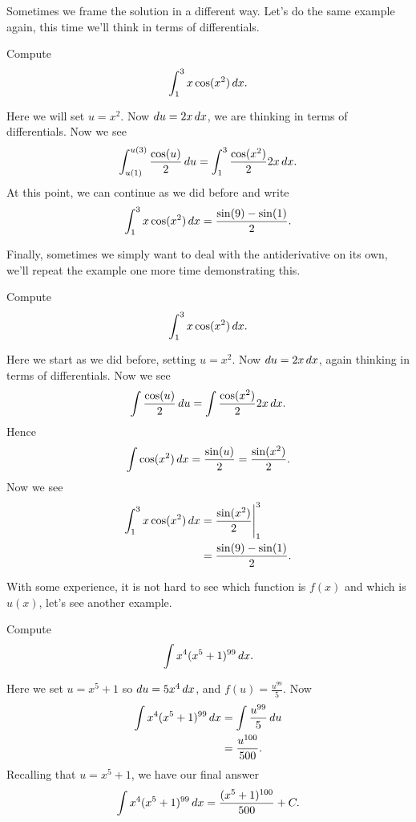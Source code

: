 Sometimes we frame the solution in a different way. Let's do the same
example again, this time we'll think in terms of differentials.

\begin{example}
Compute
\[
\int_1^3 x\cos(x^2)\, d x.
\]
\end{example}
\begin{solution}
Here we will set $u=x^2$. Now $du = 2x \, d x$, we are thinking in terms
of differentials. Now we see
\[
\int_{u(1)}^{u(3)} \frac{\cos(u)}{2}\, d u = \int_1^3\frac{\cos(x^2)}{2}2x\, d x.
\]
At this point, we can continue as we did before and write
\[
\int_1^3 x\cos(x^2)\, d x= \frac{\sin(9) -\sin(1)}{2}.
\]
\end{solution}

Finally, sometimes we simply want to deal with the antiderivative on
its own, we'll repeat the example one more time demonstrating this.

\begin{example}
Compute
\[
\int_1^3 x\cos(x^2)\, d x.
\]
\end{example}
\begin{solution}
Here we start as we did before, setting $u=x^2$. Now $du = 2x \, d x$,
again thinking in terms of differentials. Now we see
\[
\int  \frac{\cos(u)}{2}\, d u = \int \frac{\cos(x^2)}{2}2x\, d x.
\]
Hence 
\[
\int \cos(x^2)\, d x = \frac{\sin(u)}{2} = \frac{\sin(x^2)}{2}.
\]
Now we see
\begin{align*}
\int_1^3 x\cos(x^2)\, d x &=\frac{\sin(x^2)}{2}\Biggr|_1^3\\
&= \frac{\sin(9) -\sin(1)}{2}.
\end{align*}
\end{solution}

With some experience, it is not hard to see which function is $f(x)$
and which is $u(x)$, let's see another example.
\begin{example}
Compute
\[
\int x^4(x^5+1)^{99} \, d x.
\]
\end{example}

\begin{solution}
Here we set $u = x^5+1$ so $du = 5x^4 \, d x$, and $f(u) = \frac{u^{99}}{5}$. Now
\begin{align*}
\int x^4(x^5+1)^{99} \, d x &= \int \frac{u^{99}}{5} \, d u\\
&= \frac{u^{100}}{500}.
\end{align*}
Recalling that $u = x^5+1$, we have our final answer
\[
\int x^4(x^5+1)^{99} \, d x= \frac{(x^5+1)^{100}}{500}+C.
\]
\end{solution}


